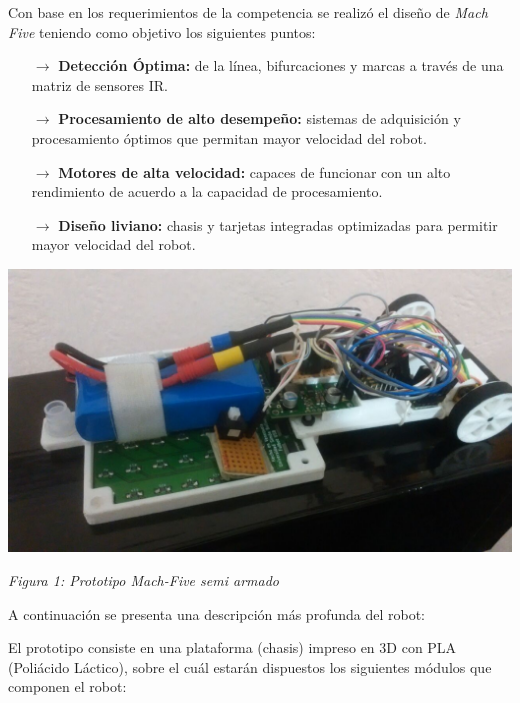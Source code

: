 \documentclass[10pt,twocolumn,legalpaper,draft]{article}
\begin{document}
\centerline{\Large{\textbf{}}}
\vspace{0,8em}

Con base en los requerimientos de la competencia se realizó el diseño de \emph{Mach Five} teniendo como objetivo los siguientes puntos:

\begin{itemize}
	\item[$\rightarrow$]\textbf{Detección Óptima:} de la línea, bifurcaciones y marcas a través de una matriz de sensores IR.
	\item[$\rightarrow$]\textbf{Procesamiento de alto desempeño:} sistemas de adquisición y procesamiento óptimos que permitan mayor velocidad del robot.
	\item[$\rightarrow$]\textbf{Motores de alta velocidad:} capaces de funcionar con un alto rendimiento de acuerdo a la capacidad de procesamiento.
	\item[$\rightarrow$]\textbf{Diseño liviano:} chasis y tarjetas integradas optimizadas para permitir mayor velocidad del robot.
\end{itemize}

\begin{center}
	\includegraphics[scale=0.18]{Robot}
	
	\textit{Figura 1: Prototipo Mach-Five semi armado}
\end{center}

A continuación se presenta una descripción más profunda del robot: \newline

\centerline{\Large{\textbf{}}}
\vspace{0,8em}

El prototipo consiste en una plataforma (chasis) impreso en 3D con PLA (Poliácido Láctico), sobre el cuál estarán dispuestos los siguientes módulos que componen el robot:\newline
\end{document}

